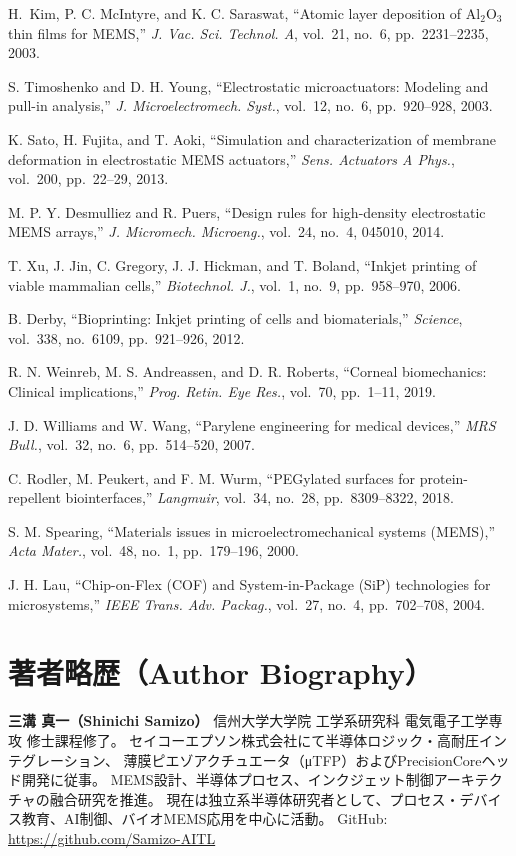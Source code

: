 \documentclass[conference]{IEEEtran}
\begin{document}

\begin{thebibliography}{99}
H.~Kim, P. C. McIntyre, and K. C. Saraswat,
“Atomic layer deposition of Al$_2$O$_3$ thin films for MEMS,”
\emph{J. Vac. Sci. Technol. A}, vol.~21, no.~6, pp.~2231–2235, 2003.

S. Timoshenko and D. H. Young,
“Electrostatic microactuators: Modeling and pull-in analysis,”
\emph{J. Microelectromech. Syst.}, vol.~12, no.~6, pp.~920–928, 2003.

K. Sato, H. Fujita, and T. Aoki,
“Simulation and characterization of membrane deformation in electrostatic MEMS actuators,”
\emph{Sens. Actuators A Phys.}, vol.~200, pp.~22–29, 2013.

M. P. Y. Desmulliez and R. Puers,
“Design rules for high-density electrostatic MEMS arrays,”
\emph{J. Micromech. Microeng.}, vol.~24, no.~4, 045010, 2014.

T. Xu, J. Jin, C. Gregory, J. J. Hickman, and T. Boland,
“Inkjet printing of viable mammalian cells,”
\emph{Biotechnol. J.}, vol.~1, no.~9, pp.~958–970, 2006.

B. Derby,
“Bioprinting: Inkjet printing of cells and biomaterials,”
\emph{Science}, vol.~338, no.~6109, pp.~921–926, 2012.

R. N. Weinreb, M. S. Andreassen, and D. R. Roberts,
“Corneal biomechanics: Clinical implications,”
\emph{Prog. Retin. Eye Res.}, vol.~70, pp.~1–11, 2019.

J. D. Williams and W. Wang,
“Parylene engineering for medical devices,”
\emph{MRS Bull.}, vol.~32, no.~6, pp.~514–520, 2007.

C. Rodler, M. Peukert, and F. M. Wurm,
“PEGylated surfaces for protein-repellent biointerfaces,”
\emph{Langmuir}, vol.~34, no.~28, pp.~8309–8322, 2018.

S. M. Spearing,
“Materials issues in microelectromechanical systems (MEMS),”
\emph{Acta Mater.}, vol.~48, no.~1, pp.~179–196, 2000.

J. H. Lau,
“Chip-on-Flex (COF) and System-in-Package (SiP) technologies for microsystems,”
\emph{IEEE Trans. Adv. Packag.}, vol.~27, no.~4, pp.~702–708, 2004.
\end{thebibliography}

\section*{著者略歴（Author Biography）}
\textbf{三溝 真一（Shinichi Samizo）} 信州大学大学院 工学系研究科 電気電子工学専攻 修士課程修了。  
セイコーエプソン株式会社にて半導体ロジック・高耐圧インテグレーション、
薄膜ピエゾアクチュエータ（μTFP）およびPrecisionCoreヘッド開発に従事。  
MEMS設計、半導体プロセス、インクジェット制御アーキテクチャの融合研究を推進。  
現在は独立系半導体研究者として、プロセス・デバイス教育、AI制御、バイオMEMS応用を中心に活動。  
GitHub: \url{https://github.com/Samizo-AITL}

\balance
\end{document}
